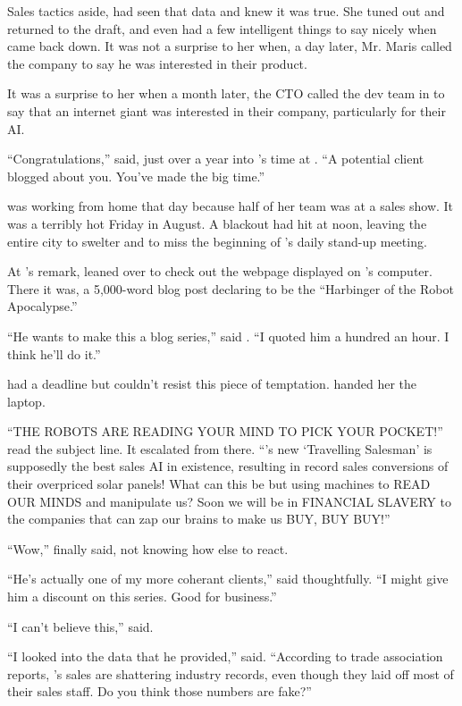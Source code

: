 Sales tactics aside, {\protag} had seen that data and knew it was true. She tuned out and returned to the draft, and even had a few intelligent things to say nicely when \energyJerk{} came back down. It was not a surprise to her when, a day later, Mr. Maris called the company to say he was interested in their product.

It was a surprise to her when a month later, the CTO called the dev team in to say that an internet giant was interested in their company, particularly for their AI.

\sectionBreak{}

``Congratulations,'' {\sidetag} said, just over a year into {\protag}’s time at \energyCompany{}. ``A potential client blogged about you. You've made the big time.''

{\protag} was working from home that day because half of her team was at a sales show. It was a terribly hot Friday in August. A blackout had hit \crunchyCity{} at noon, leaving the entire city to swelter and {\protag} to miss the beginning of \energyCompany{}'s daily stand-up meeting.

At {\sidetag}'s remark, {\protag} leaned over to check out the webpage displayed on {\sidetag}'s computer. There it was, a 5,000-word blog post declaring \energyCompany{} to be the ``Harbinger of the Robot Apocalypse.''

``He wants to make this a blog series,'' said {\sidetag}. ``I quoted him a hundred an hour. I think he'll do it.''

{\protag} had a deadline but couldn't resist this piece of temptation. {\sidetag} handed her the laptop.

``THE ROBOTS ARE READING YOUR MIND TO PICK YOUR POCKET!'' read the subject line. It escalated from there. ``\energyCompany{}'s new `Travelling Salesman' is supposedly the best sales AI in existence, resulting in record sales conversions of their overpriced solar panels! What can this be but using machines to READ OUR MINDS and manipulate us? Soon we will be in FINANCIAL SLAVERY to the companies that can zap our brains to make us BUY, BUY BUY!''

``Wow,'' {\protag} finally said, not knowing how else to react.

``He's actually one of my more coherant clients,'' {\sidetag} said thoughtfully. ``I might give him a discount on this series. Good for business.''

``I can't believe this,'' {\protag} said.

``I looked into the data that he provided,'' {\sidetag} said. ``According to trade association reports, \energyCompany{}'s sales are shattering industry records, even though they laid off most of their sales staff. Do you think those numbers are fake?''

